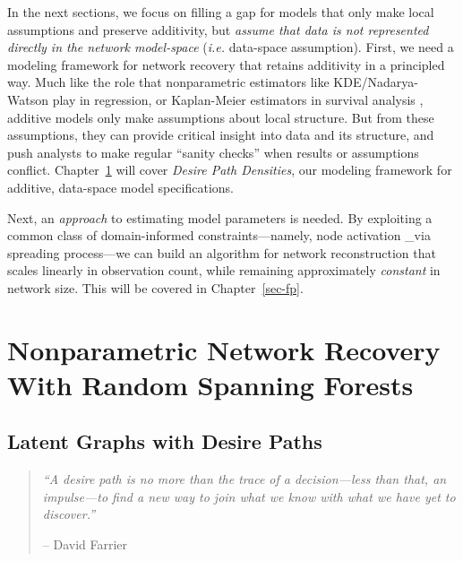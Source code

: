 \documentclass[%
	12pt,
		oneside,
		letterpaper
]{book}
\begin{document}
In the next sections, we focus on filling a gap for models that only
make local assumptions and preserve additivity, but \emph{assume that
data is not represented directly in the network model-space}
(\emph{i.e.} data-space assumption). First, we need a modeling framework
for network recovery that retains additivity in a principled way. Much
like the role that nonparametric estimators like KDE/Nadarya-Watson play
in regression, or Kaplan-Meier estimators in survival analysis
\autocite{Topicsadvancedeconometrics_Bierens1996,NonparametricEstimationIncomplete_Kaplan1958},
additive models only make assumptions about local structure. But from
these assumptions, they can provide critical insight into data and its
structure, and push analysts to make regular ``sanity checks'' when
results or assumptions conflict. Chapter~\ref{sec-desirepath} will cover
\emph{Desire Path Densities}, our modeling framework for additive,
data-space model specifications.

Next, an \emph{approach} to estimating model parameters is needed. By
exploiting a common class of domain-informed constraints---namely, node
activation \_via spreading process---we can build an algorithm for
network reconstruction that scales linearly in observation count, while
remaining approximately \emph{constant} in network size. This will be
covered in Chapter~\ref{sec-fp}.

\part{Nonparametric Network Recovery With Random Spanning Forests}

\chapter{Latent Graphs with Desire Paths}\label{sec-desirepath}

\begin{flushright}

\begin{minipage}{.7\linewidth}

\singlespacing

\begin{quote}
\emph{``A desire path is no more than the trace of a decision---less
than that, an impulse---to find a new way to join what we know with what
we have yet to discover.''}

\hfill -- David Farrier\\
\doublespacing
\end{quote}

\end{minipage}

\end{flushright}
\end{document}
